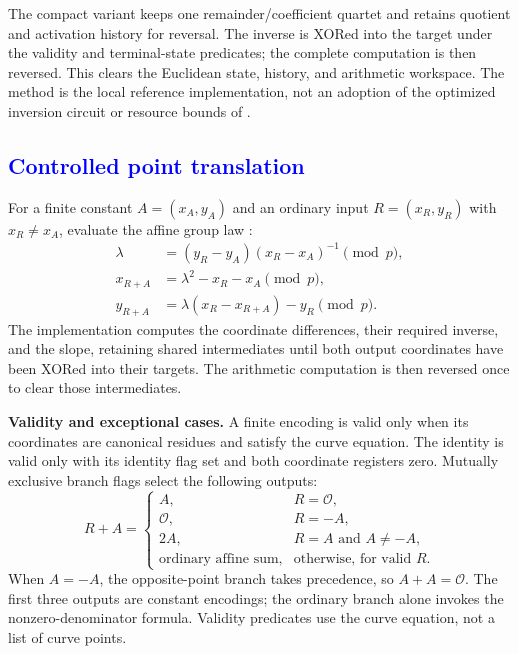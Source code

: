 \begin{revision}
The compact variant keeps one remainder/coefficient quartet and
retains quotient and activation history for reversal. The inverse is
XORed into the target under the validity and terminal-state predicates;
the complete computation is then reversed. This clears the Euclidean
state, history, and arithmetic workspace. The method is the local
reference implementation, not an adoption of the optimized inversion
circuit or resource bounds of \cite{Roetteler2017}.
\end{revision}

\subsection{\textcolor{blue}{Controlled point translation}}
\begin{revision}
For a finite constant $A=(x_A,y_A)$ and an ordinary input
$R=(x_R,y_R)$ with $x_R\neq x_A$, evaluate the affine group law
\cite{Silverman2009,Washington2008}:
\begin{equation}
\label{eq:affine_translation}
\begin{aligned}
\lambda&=(y_R-y_A)(x_R-x_A)^{-1}\pmod p,\\
x_{R+A}&=\lambda^2-x_R-x_A\pmod p,\\
y_{R+A}&=\lambda(x_R-x_{R+A})-y_R\pmod p.
\end{aligned}
\end{equation}
The implementation computes the coordinate differences, their required
inverse, and the slope, retaining shared intermediates until both output
coordinates have been XORed into their targets. The arithmetic
computation is then reversed once to clear those intermediates.

\textbf{Validity and exceptional cases.}
A finite encoding is valid only when its coordinates are canonical
residues and satisfy the curve equation. The identity is valid only
with its identity flag set and both coordinate registers zero.
Mutually exclusive branch flags select the following outputs:
\[
R+A=
\begin{cases}
A,&R=\mathcal O,\\
\mathcal O,&R=-A,\\
2A,&R=A\text{ and }A\neq-A,\\
\text{ordinary affine sum},&\text{otherwise, for valid }R.
\end{cases}
\]
When $A=-A$, the opposite-point branch takes precedence, so
$A+A=\mathcal O$. The first three outputs are constant encodings;
the ordinary branch alone invokes the nonzero-denominator formula.
Validity predicates use the curve equation, not a list of curve points.


\end{revision}
